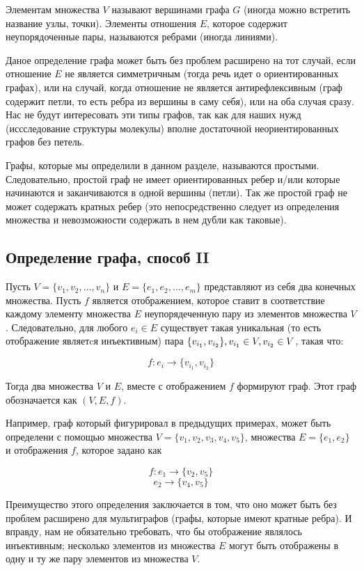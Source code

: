 \documentclass{article}
\begin{document}
Элементам множества $V$ называют вершинами графа $G$ (иногда можно встретить название узлы, точки). Элементы отношения $E$, которое содержит неупорядоченные пары, называются ребрами (иногда линиями).

Даное определение графа может быть без проблем расширено на тот случай, если отношение $E$ не является симметричным (тогда речь идет о ориентированных графах), или на случай, когда отношение не является антирефлексивным (граф содержит петли, то есть ребра из вершины в саму себя), или на оба случая сразу. Нас не будут интересовать эти типы графов, так как для наших нужд (иссследование структуры молекулы) вполне достаточной неориентированных графов без петель.

Графы, которые мы определили в данном разделе, называются простыми. Следовательно, простой граф не имеет ориентированных ребер и/или которые начинаются и заканчиваются в одной вершины (петли). Так же простой граф не может содержать кратных ребер (это непосредственно следует из определения множества и невозможности содержать в нем дубли как таковые).
 
\subsection{Определение графа, способ II}

Пусть $V = \{ v_1, v_2, \dots, v_n \}$ и $E = \{ e_1, e_2, \dots, e_m \}$ представляют из себя два конечных множества. Пусть $f$ является отображением, которое ставит в соответствие каждому элементу множества $E$ неупорядеченную пару из элементов множества $V$. Следовательно, для любого $e_i \in E$ существует такая уникальная (то есть отображение являетcя инъективным) пара  $\{v_{i_1}, v_{i_2} \}, \newline v_{i_1} \in V, v_{i_2} \in V$, такая что:

$$ f: e_i \rightarrow \{ v_{i_1}, v_{i_2} \} $$

Тогда два множества $V$ и $E$, вместе с отображением $f$ формируют граф. Этот граф обозначается как $(V, E, f)$.

Например, граф который фигурировал в предыдущих примерах, может быть определени с помощью множества $V = \{ v_1, v_2, v_3, v_4, v_5 \}$, множества 
$E = \{ e_1, e_2 \}$ и отображения $f$, которое задано как 

$$ f: e_1 \rightarrow \{ v_2, v_5 \}$$ 
$$e_2 \rightarrow \{ v_4, v_5 \} $$

Преимущество этого определения заключается в том, что оно может быть без проблем расширено для мультиграфов (графы, которые имеют кратные ребра).
И вправду, нам не обязательно требовать, что бы отображение являлось инъективным; несколько элементов из множества $E$ могут быть отображены в одну и ту
же пару элементов из множества $V$.
\end{document}
